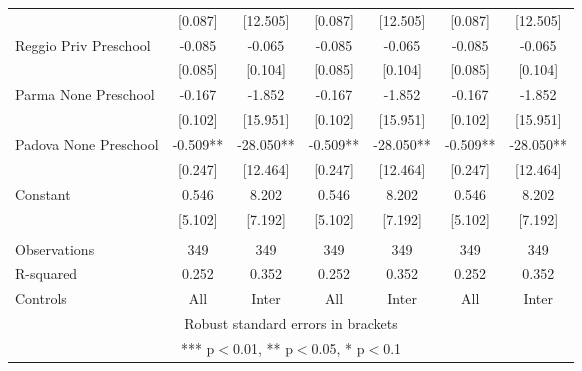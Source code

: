 \begin{tabular}{lcccccc}
 & [0.087] & [12.505] & [0.087] & [12.505] & [0.087] & [12.505] \\
Reggio Priv Preschool & -0.085 & -0.065 & -0.085 & -0.065 & -0.085 & -0.065 \\
 & [0.085] & [0.104] & [0.085] & [0.104] & [0.085] & [0.104] \\
Parma None Preschool & -0.167 & -1.852 & -0.167 & -1.852 & -0.167 & -1.852 \\
 & [0.102] & [15.951] & [0.102] & [15.951] & [0.102] & [15.951] \\
Padova None Preschool & -0.509** & -28.050** & -0.509** & -28.050** & -0.509** & -28.050** \\
 & [0.247] & [12.464] & [0.247] & [12.464] & [0.247] & [12.464] \\
Constant & 0.546 & 8.202 & 0.546 & 8.202 & 0.546 & 8.202 \\
 & [5.102] & [7.192] & [5.102] & [7.192] & [5.102] & [7.192] \\
 &  &  &  &  &  &  \\
Observations & 349 & 349 & 349 & 349 & 349 & 349 \\
R-squared & 0.252 & 0.352 & 0.252 & 0.352 & 0.252 & 0.352 \\
 Controls & All & Inter & All & Inter & All & Inter \\ \hline
\multicolumn{7}{c}{ Robust standard errors in brackets} \\
\multicolumn{7}{c}{ *** p$<$0.01, ** p$<$0.05, * p$<$0.1} \\
\end{tabular}
